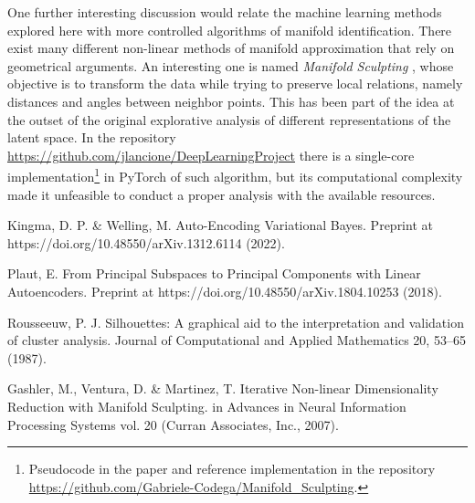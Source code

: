 \documentclass[twocolumn,gsifonts,twoside]{gsipaper}
\begin{document}
One further interesting discussion would relate the machine learning methods explored here with more controlled algorithms of manifold identification. There exist many different non-linear methods of manifold approximation that rely on geometrical arguments. An interesting one is named \emph{Manifold Sculpting} \cite{Gashler2007}, whose objective is to transform the data while trying to preserve local relations, namely distances and angles between neighbor points. This has been part of the idea at the outset of the original explorative analysis of different representations of the latent space. In the repository \url{https://github.com/jlancione/DeepLearningProject} there is a single-core implementation\footnote{Pseudocode in the paper \cite{Gashler2007} and reference implementation in the repository \url{https://github.com/Gabriele-Codega/Manifold_Sculpting}.} in PyTorch of such algorithm, but its computational complexity made it unfeasible to conduct a proper analysis with the available resources. 



%  

\begin{thebibliography}{99}
  Kingma, D. P. \& Welling, M. Auto-Encoding Variational Bayes. Preprint at https://doi.org/10.48550/arXiv.1312.6114 (2022).

  Plaut, E. From Principal Subspaces to Principal Components with Linear Autoencoders. Preprint at https://doi.org/10.48550/arXiv.1804.10253 (2018).

  Rousseeuw, P. J. Silhouettes: A graphical aid to the interpretation and validation of cluster analysis. Journal of Computational and Applied Mathematics 20, 53–65 (1987).

  Gashler, M., Ventura, D. \& Martinez, T. Iterative Non-linear Dimensionality Reduction with Manifold Sculpting. in Advances in Neural Information Processing Systems vol. 20 (Curran Associates, Inc., 2007).
\end{thebibliography}
\end{document}
